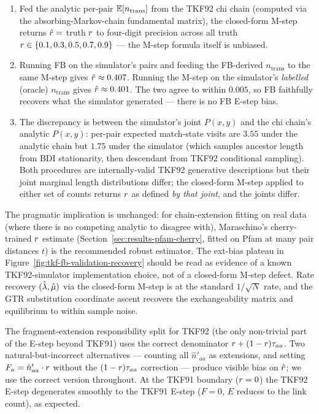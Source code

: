 \begin{enumerate}[nosep]
\item Fed the analytic per-pair $\mathbb{E}[n_{\text{trans}}]$ from
  the TKF92 chi chain (computed via the absorbing-Markov-chain
  fundamental matrix), the closed-form M-step returns
  $\hat{r} = $ truth $r$ to four-digit precision across all
  truth $r \in \{0.1, 0.3, 0.5, 0.7, 0.9\}$ --- the M-step
  formula itself is unbiased.
\item Running FB on the simulator's pairs and feeding the
  FB-derived $n_{\text{trans}}$ to the same M-step gives
  $\hat{r} \approx 0.407$.  Running the M-step on the
  simulator's \emph{labelled} (oracle) $n_{\text{trans}}$ gives
  $\hat{r} \approx 0.401$.  The two agree to within $0.005$, so
  FB faithfully recovers what the simulator generated --- there is
  no FB E-step bias.
\item The discrepancy is between the simulator's joint
  $P(x, y)$ and the chi chain's analytic $P(x, y)$: per-pair
  expected match-state visits are $3.55$ under the analytic
  chain but $1.75$ under the simulator (which samples
  ancestor length from BDI stationarity, then descendant from
  TKF92 conditional sampling).  Both procedures are
  internally-valid TKF92 generative descriptions but their joint
  marginal length distributions differ; the closed-form M-step
  applied to either set of counts returns $r$ as defined
  \emph{by that joint}, and the joints differ.
\end{enumerate}

The pragmatic implication is unchanged: for chain-extension
fitting on real data (where there is no competing analytic
to disagree with), Maraschino's cherry-trained $r$ estimate
(Section~\ref{sec:results-pfam-cherry}, fitted on Pfam at many
pair distances $t$) is the recommended robust estimator.  The
ext-bias plateau in
Figure~\ref{fig:tkf-fb-validation-recovery} should be read as
evidence of a known TKF92-simulator implementation choice, not
of a closed-form M-step defect.  Rate recovery
$(\hat{\lambda}, \hat{\mu})$ via the closed-form M-step is at
the standard $1/\sqrt{N}$ rate, and the GTR substitution
coordinate ascent recovers the exchangeability matrix and
equilibrium to within sample noise.

The fragment-extension responsibility split for TKF92 (the only
non-trivial part of the E-step beyond TKF91) uses the correct
denominator $r + (1-r)\tau_{aa}$.  Two
natural-but-incorrect alternatives --- counting all
$\hat n'_{aa}$ as extensions, and setting $F_a = \hat n'_{aa}
\cdot r$ without the $(1-r)\tau_{aa}$ correction ---
produce visible bias on $\hat{r}$; we use the
correct version throughout.  At the TKF91 boundary ($r = 0$)
the TKF92 E-step degenerates smoothly to the TKF91 E-step
($F = 0$, $E$ reduces to the link count), as expected.

